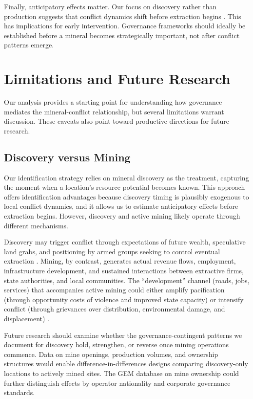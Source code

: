 \documentclass[11pt]{article}
\begin{document}
Finally, anticipatory effects matter. Our focus on discovery rather than production suggests that conflict dynamics shift before extraction begins \citep{cotet2013oil, arezki2017natural}. This has implications for early intervention. Governance frameworks should ideally be established before a mineral becomes strategically important, not after conflict patterns emerge.

\section{Limitations and Future Research}

Our analysis provides a starting point for understanding how governance mediates the mineral-conflict relationship, but several limitations warrant discussion. These caveats also point toward productive directions for future research.
\subsection{Discovery versus Mining}

Our identification strategy relies on mineral discovery as the treatment, capturing the moment when a location's resource potential becomes known. This approach offers identification advantages because discovery timing is plausibly exogenous to local conflict dynamics, and it allows us to estimate anticipatory effects before extraction begins. However, discovery and active mining likely operate through different mechanisms.

Discovery may trigger conflict through expectations of future wealth, speculative land grabs, and positioning by armed groups seeking to control eventual extraction \citep{cust2015dutch, lei2019natural}. Mining, by contrast, generates actual revenue flows, employment, infrastructure development, and sustained interactions between extractive firms, state authorities, and local communities. The ``development'' channel (roads, jobs, services) that accompanies active mining could either amplify pacification (through opportunity costs of violence and improved state capacity) or intensify conflict (through grievances over distribution, environmental damage, and displacement) \citep{aragon2015mining, kotsadam2018industrial}.

Future research should examine whether the governance-contingent patterns we document for discovery hold, strengthen, or reverse once mining operations commence. Data on mine openings, production volumes, and ownership structures would enable difference-in-differences designs comparing discovery-only locations to actively mined sites. The GEM database on mine ownership could further distinguish effects by operator nationality and corporate governance standards.
\end{document}
